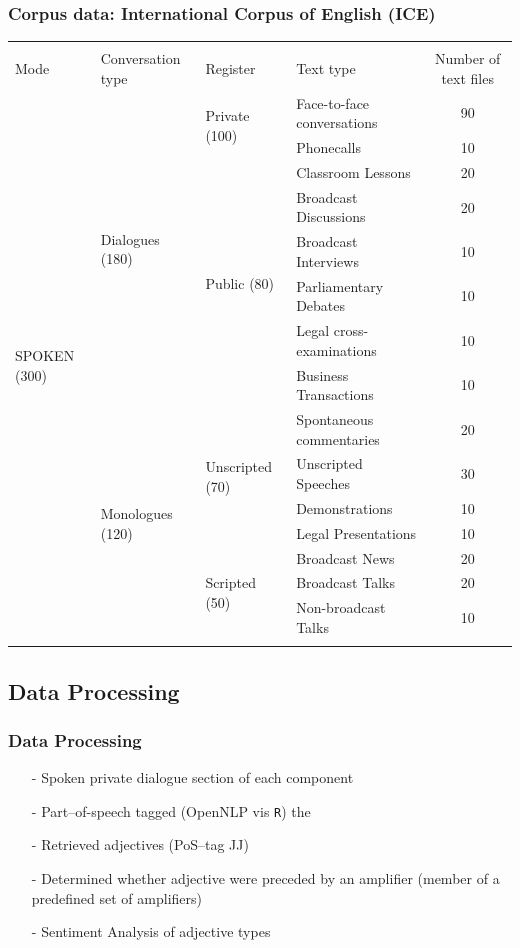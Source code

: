 \documentclass[12pt, table]{beamer}
\begin{document}
\begin{frame}
\frametitle{Corpus data: International Corpus of English (ICE)}
\begin{table}
\begin{tiny}
\begin{tabularx}{\textwidth}{l lllc}
\hline\\
Mode & Conversation type & Register & Text type & Number of text files\\
\hline
\multirow{15}{*}{SPOKEN (300)} & \multirow{8}{*}{Dialogues (180)} & \multirow{2}{*}{Private (100)} & Face-to-face conversations & 90\\
& & & Phonecalls & 10\\
\cline{3-5}
& & \multirow{6}{*}{Public (80)} & Classroom Lessons & 20\\
& & & Broadcast Discussions & 20\\
& & & Broadcast Interviews & 10\\
& & & Parliamentary Debates & 10\\
& & & Legal cross-examinations & 10\\
& & & Business Transactions & 10\\
\cline{2-5}
& \multirow{7}{*}{Monologues (120)} & \multirow{4}{*}{Unscripted (70)} & Spontaneous commentaries & 20\\
& & & Unscripted Speeches & 30\\
& & & Demonstrations & 10\\
& & & Legal Presentations & 10\\
\cline{3-5}
& & \multirow{3}{*}{Scripted (50)} & Broadcast News & 20\\
& & & Broadcast Talks & 20\\
& & & Non-broadcast Talks & 10\\
\hline\\
\end{tabularx}
\end{tiny}
\end{table}
\end{frame}

\subsection{Data Processing}
\begin{frame}
\frametitle{Data Processing}
\begin{itemize}
\item[-] Spoken private dialogue section of each component
\item[-] Part--of-speech tagged (OpenNLP vis \texttt{R}) the 
\item[-] Retrieved adjectives (PoS--tag JJ)
\item[-] Determined whether adjective were preceded by an amplifier (member of a predefined set of amplifiers)
\item[-] Sentiment Analysis of adjective types \textcolor{gray}{\begin{scriptsize}\citep{jockers2017postdonqujiote}\end{scriptsize}}
\end{itemize}
\end{frame}
\end{document}
